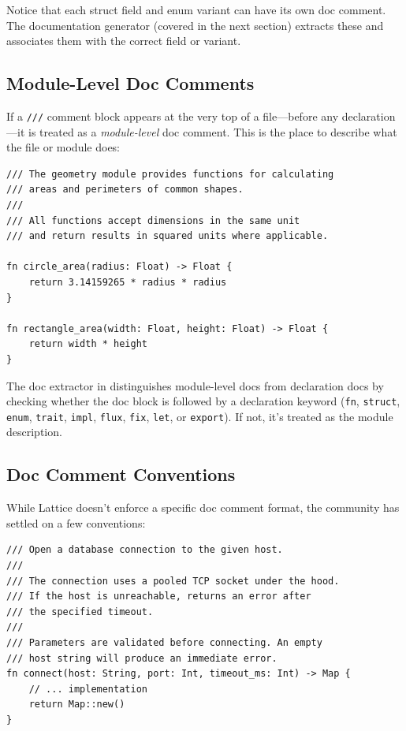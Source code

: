 Notice that each struct field and enum variant can have its own doc comment.
The documentation generator (covered in the next section) extracts these and associates them with the correct field or variant.

\subsection{Module-Level Doc Comments}\label{sec:module-doc}

If a \lstinline|///| comment block appears at the very top of a file---before any declaration---it is treated as a \emph{module-level} doc comment.
This is the place to describe what the file or module does:

\begin{lstlisting}[language=Lattice, caption={Module-level documentation}]
/// The geometry module provides functions for calculating
/// areas and perimeters of common shapes.
///
/// All functions accept dimensions in the same unit
/// and return results in squared units where applicable.

fn circle_area(radius: Float) -> Float {
    return 3.14159265 * radius * radius
}

fn rectangle_area(width: Float, height: Float) -> Float {
    return width * height
}
\end{lstlisting}

The doc extractor in  distinguishes module-level docs from declaration docs by checking whether the doc block is followed by a declaration keyword (\lstinline|fn|, \lstinline|struct|, \lstinline|enum|, \lstinline|trait|, \lstinline|impl|, \lstinline|flux|, \lstinline|fix|, \lstinline|let|, or \lstinline|export|).
If not, it's treated as the module description.

\subsection{Doc Comment Conventions}\label{sec:doc-conventions}

While Lattice doesn't enforce a specific doc comment format, the community has settled on a few conventions:

\begin{lstlisting}[language=Lattice, caption={Recommended doc comment style}]
/// Open a database connection to the given host.
///
/// The connection uses a pooled TCP socket under the hood.
/// If the host is unreachable, returns an error after
/// the specified timeout.
///
/// Parameters are validated before connecting. An empty
/// host string will produce an immediate error.
fn connect(host: String, port: Int, timeout_ms: Int) -> Map {
    // ... implementation
    return Map::new()
}
\end{lstlisting}

